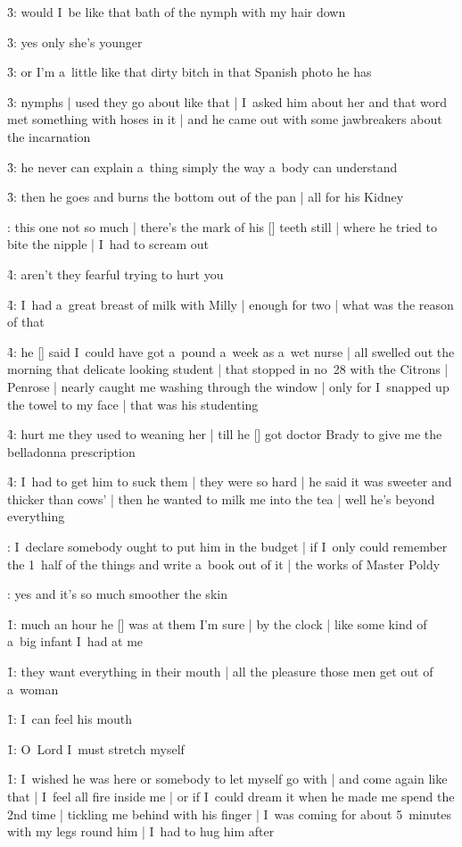 \f3:
would I~be like that bath of the nymph with my hair down

\f3:
yes only she's younger

\f3:
or I'm a~little like that dirty bitch in that Spanish photo he has

\f3:
nymphs |
used they go about like that |
I~asked him about her and that word met something with hoses in it |
and he came out with some jawbreakers about the incarnation

\f3:
he never can explain a~thing simply the way a~body can understand

\f3:
then he goes and burns the bottom out of the pan |
all for his Kidney

:
this one not so much |
there's the mark of his [\boylan] teeth still |
where he tried to bite the nipple |
I~had to scream out

\f4:
aren't they fearful trying to hurt you

\f4:
I~had a~great breast of milk with Milly |
enough for two |
what was the reason of that

\f4:
he [\bloom] said I~could have got a~pound a~week as a~wet nurse |
all swelled out the morning that delicate looking student |
that stopped in no~28 with the Citrons |
Penrose |
nearly caught me washing through the window |
only for I~snapped up the towel to my face |
that was his studenting

\f4:
hurt me they used to weaning her |
till he [\bloom] got doctor Brady to give me the belladonna prescription

\f4:
I~had to get him to suck them |
they were so hard |
he said it was sweeter and thicker than cows' |
then he wanted to milk me into the tea |
well he's beyond everything

:
I~declare somebody ought to put him in the budget |
if I~only could remember the 1~half of the things
and write a~book out of it |
the works of Master Poldy

:
yes and it's so much smoother the skin

\f1:
much an hour he [\boylan] was at them I'm sure |
by the clock |
like some kind of a~big infant I~had at me

\f1:
they want everything in their mouth |
all the pleasure those men get out of a~woman

\f1:
I~can feel his mouth

\f1:
O~Lord I~must stretch myself

\f1:
I~wished he was here or somebody to let myself go with |
and come again like that |
I~feel all fire inside me |
or if I~could dream it when he made me spend the 2nd time |
tickling me behind with his finger |
I~was coming for about 5~minutes with my legs round him |
I~had to hug him after

